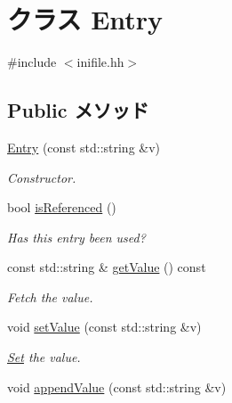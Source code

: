 \hypertarget{classIniFile_1_1Entry}{
\section{クラス Entry}
\label{classIniFile_1_1Entry}
}


{\ttfamily \#include $<$inifile.hh$>$}\subsection*{Public メソッド}
\begin{DoxyCompactItemize}
\item 
\hyperlink{classIniFile_1_1Entry_a38bba8135a438b494174f2d6f9c205e2}{Entry} (const std::string \&v)
\begin{DoxyCompactList}\small\item\em Constructor. \item\end{DoxyCompactList}\item 
bool \hyperlink{classIniFile_1_1Entry_a9bb33643f50132c7eb254763f4509d23}{isReferenced} ()
\begin{DoxyCompactList}\small\item\em Has this entry been used? \item\end{DoxyCompactList}\item 
const std::string \& \hyperlink{classIniFile_1_1Entry_afe5c74ba0aa0f51d7ee58011f3d0f026}{getValue} () const 
\begin{DoxyCompactList}\small\item\em Fetch the value. \item\end{DoxyCompactList}\item 
void \hyperlink{classIniFile_1_1Entry_ab1914d8383ee7029a02fee3f6fb8c0df}{setValue} (const std::string \&v)
\begin{DoxyCompactList}\small\item\em \hyperlink{classSet}{Set} the value. \item\end{DoxyCompactList}\item 
void \hyperlink{classIniFile_1_1Entry_a9f2f91e32fa6eeccf8d27300994d3a6a}{appendValue} (const std::string \&v)
\end{DoxyCompactItemize}
